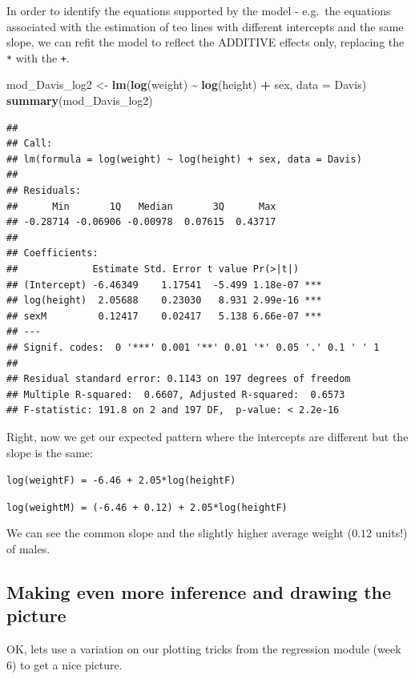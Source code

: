 \documentclass[
]{book}
\newenvironment{Shaded}{\begin{snugshade}}{\end{snugshade}}
\newcommand{\AttributeTok}[1]{\textcolor[rgb]{0.13,0.29,0.53}{#1}}
\newcommand{\FunctionTok}[1]{\textcolor[rgb]{0.13,0.29,0.53}{\textbf{#1}}}
\newcommand{\NormalTok}[1]{#1}
\newcommand{\OtherTok}[1]{\textcolor[rgb]{0.56,0.35,0.01}{#1}}
\newcommand{\SpecialCharTok}[1]{\textcolor[rgb]{0.81,0.36,0.00}{\textbf{#1}}}
\begin{document}
In order to identify the equations supported by the model - e.g.~the equations associated with the estimation of teo lines with different intercepts and the same slope, we can refit the model to reflect the ADDITIVE effects only, replacing the \texttt{*} with the \texttt{+}.

\begin{Shaded}
\begin{Highlighting}[]
\NormalTok{mod\_Davis\_log2 }\OtherTok{\textless{}{-}} \FunctionTok{lm}\NormalTok{(}\FunctionTok{log}\NormalTok{(weight) }\SpecialCharTok{\textasciitilde{}} \FunctionTok{log}\NormalTok{(height) }\SpecialCharTok{+}\NormalTok{ sex, }\AttributeTok{data =}\NormalTok{ Davis)}
\FunctionTok{summary}\NormalTok{(mod\_Davis\_log2)}
\end{Highlighting}
\end{Shaded}

\begin{verbatim}
## 
## Call:
## lm(formula = log(weight) ~ log(height) + sex, data = Davis)
## 
## Residuals:
##      Min       1Q   Median       3Q      Max 
## -0.28714 -0.06906 -0.00978  0.07615  0.43717 
## 
## Coefficients:
##             Estimate Std. Error t value Pr(>|t|)    
## (Intercept) -6.46349    1.17541  -5.499 1.18e-07 ***
## log(height)  2.05688    0.23030   8.931 2.99e-16 ***
## sexM         0.12417    0.02417   5.138 6.66e-07 ***
## ---
## Signif. codes:  0 '***' 0.001 '**' 0.01 '*' 0.05 '.' 0.1 ' ' 1
## 
## Residual standard error: 0.1143 on 197 degrees of freedom
## Multiple R-squared:  0.6607, Adjusted R-squared:  0.6573 
## F-statistic: 191.8 on 2 and 197 DF,  p-value: < 2.2e-16
\end{verbatim}

Right, now we get our expected pattern where the intercepts are different but the slope is the same:

\texttt{log(weightF)\ =\ -6.46\ +\ 2.05*log(heightF)}

\texttt{log(weightM)\ =\ (-6.46\ +\ 0.12)\ +\ 2.05*log(heightF)}

We can see the common slope and the slightly higher average weight (\(0.12\) units!) of males.

\subsection{Making even more inference and drawing the picture}\label{making-even-more-inference-and-drawing-the-picture}

OK, lets use a variation on our plotting tricks from the regression module (week 6) to get a nice picture.
\end{document}
